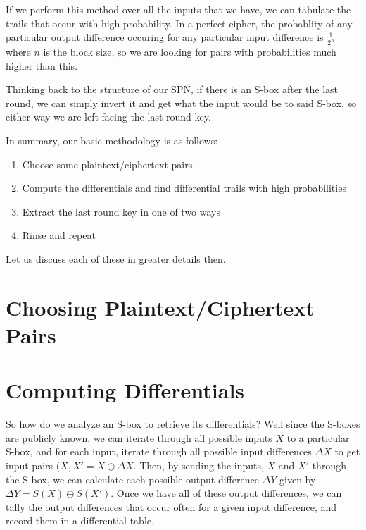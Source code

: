 If we perform this method over all the inputs that we have, we can tabulate
the trails that occur with high probability. In a perfect cipher, the probablity
of any particular output difference occuring for any particular input difference
is $\frac{1}{2^n}$ \cite[p. 19]{Heys} where $n$ is the block size, so we are
looking for pairs with probabilities much higher than this.

Thinking back to the structure of our SPN, if there is an S-box after the last
round, we can simply invert it and get what the input would be to  said S-box,
so either way we are left facing the last round key.  


In summary, our basic methodology is as follows:
\begin{enumerate}
\item Choose some plaintext/ciphertext pairs.
\item Compute the differentials and find differential trails with high probabilities 
\item Extract the last round key in one of two ways
\item Rinse and repeat
\end{enumerate}

Let us discuss each of these in greater details then.

\section{Choosing Plaintext/Ciphertext Pairs}

\section{Computing Differentials}
So how do we analyze an S-box to retrieve its differentials? Well since the S-boxes
are publicly known, we can iterate through all possible inputs $X$ to a particular S-box,
and for each input, iterate through all possible input differences $\Delta X$ to get 
input pairs $(X, X' = X \oplus \Delta X$. Then, by sending the inputs, $X$ and $X'$
through the S-box, we can calculate each possible output difference $\Delta Y$ given
by $\Delta Y = S(X) \oplus S(X')$. Once we have all of these output differences,
we can tally the output differences that occur often for a given input difference,
and record them in a differential table. 

